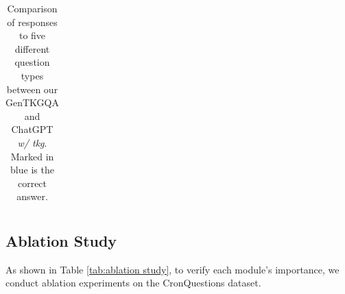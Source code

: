 \documentclass[11pt]{article}
\begin{document}
\begin{table}[t]
{\begin{tabular}{c|c|c|c}
    \bottomrule
    \end{tabular}}
    \caption{Comparison of responses to five different question types between our GenTKGQA and ChatGPT \textit{w/ tkg}. Marked in blue is the correct answer.}
\label{tab:case study}
\end{table}

    


\subsection{Ablation Study}\label{sec:ablation}

As shown in Table \ref{tab:ablation study}, to verify each module's importance, we conduct ablation experiments on the CronQuestions dataset.
\end{document}
